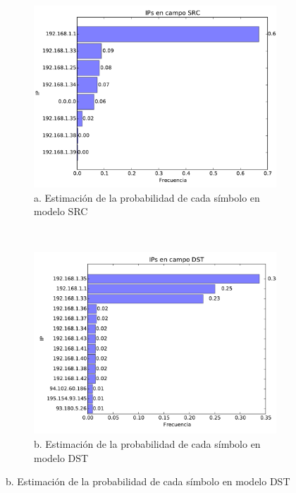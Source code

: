 \begin{figure}[H]
	\center
	\begin{subfigure}{0.43\textwidth}
		\includegraphics[width=1.0\textwidth]{resultados/casa/ipsSrc_1_6805902069.pdf}
		\caption{a. Estimaci\'on de la probabilidad de cada s\'imbolo en modelo SRC}
	\end{subfigure}
	~
	\begin{subfigure}{0.43\textwidth}
		\includegraphics[width=1.0\textwidth]{resultados/casa/ipsDst_2_67355481854.pdf}
		\caption{b. Estimaci\'on de la probabilidad de cada s\'imbolo en modelo DST}
	\end{subfigure}
\end{figure}

